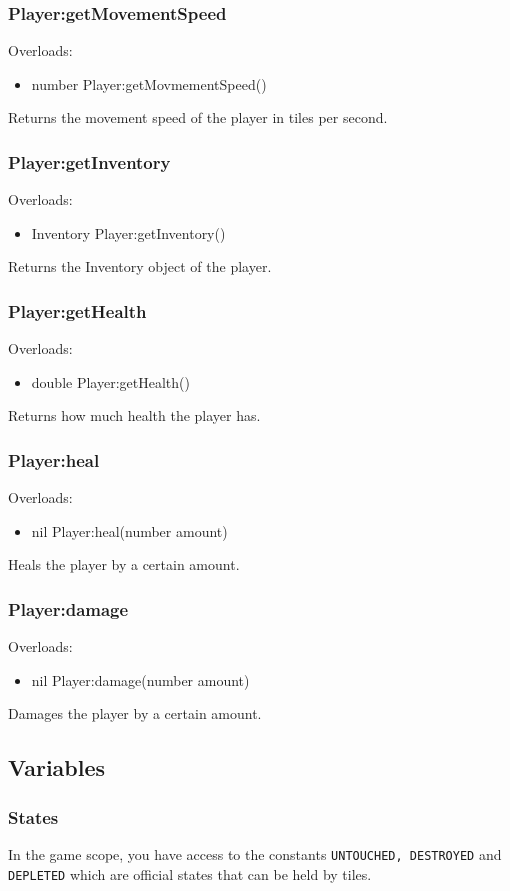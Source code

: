 \documentclass{book}
\newenvironment{ulist}
	{\begin{itemize}
			\itemsep0em}
	{\end{itemize}}
\begin{document}
\subsubsection{Player:getMovementSpeed}
Overloads:
\begin{ulist}
	\item number Player:getMovmementSpeed()
\end{ulist}
Returns the movement speed of the player in tiles per second.

\subsubsection{Player:getInventory}
Overloads:
\begin{ulist}
	\item Inventory Player:getInventory()
\end{ulist}
Returns the Inventory object of the player.

\subsubsection{Player:getHealth}
Overloads:
\begin{ulist}
	\item double Player:getHealth()
\end{ulist}
Returns how much health the player has.

\subsubsection{Player:heal}
Overloads:
\begin{ulist}
	\item nil Player:heal(number amount)
\end{ulist}
Heals the player by a certain amount.

\subsubsection{Player:damage}
Overloads:
\begin{ulist}
	\item nil Player:damage(number amount)
\end{ulist}
Damages the player by a certain amount.


\subsection{Variables}
\subsubsection{States}
In the game scope, you have access to the constants \texttt{UNTOUCHED, DESTROYED} and \texttt{DEPLETED} which are official states that can be held by tiles.
\end{document}
